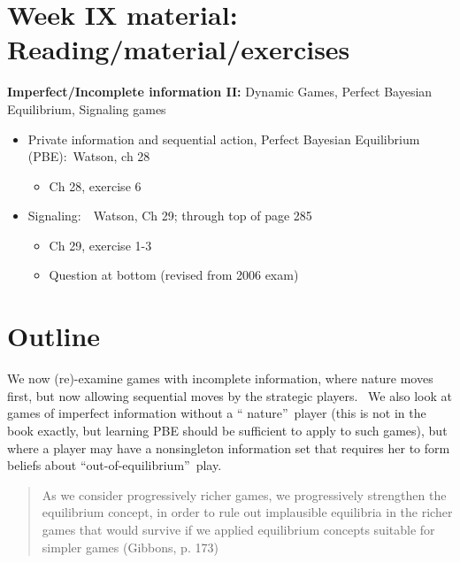\documentclass{article}
\begin{document}
\section{Week IX material: Reading/material/exercises}

\textbf{Imperfect/Incomplete information II: }Dynamic Games, Perfect
Bayesian Equilibrium, Signaling games

\begin{itemize}
\item Private information and sequential action, Perfect Bayesian
Equilibrium (PBE):\ Watson, ch 28

\begin{itemize}
\item Ch 28, exercise 6
\end{itemize}

\item Signaling:\ \ Watson, Ch 29; through top of page 285

\begin{itemize}
\item Ch 29, exercise 1-3

\item Question at bottom (revised from 2006 exam)
\end{itemize}
\end{itemize}

\bigskip

\section{Outline}

We now (re)-examine games with incomplete information, where nature moves
first, but now allowing sequential moves by the strategic players. \ We also
look at games of imperfect information without a \textquotedblleft
nature\textquotedblright\ player {\footnotesize (this is not in the book
exactly, but learning PBE should be sufficient to apply to such games)}, but
where a player may have a nonsingleton information set that requires her to
form beliefs about \textquotedblleft out-of-equilibrium\textquotedblright\
play. \bigskip

\begin{quote}
As we consider progressively richer games, we progressively strengthen the
equilibrium concept, in order to rule out implausible equilibria in the
richer games that would survive if we applied equilibrium concepts suitable
for simpler games (Gibbons, p. 173)
\end{quote}
\end{document}
